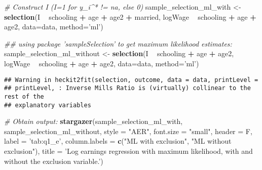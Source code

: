 \documentclass[
]{article}
\newenvironment{Shaded}{\begin{snugshade}}{\end{snugshade}}
\newcommand{\CommentTok}[1]{\textcolor[rgb]{0.56,0.35,0.01}{\textit{#1}}}
\newcommand{\DataTypeTok}[1]{\textcolor[rgb]{0.13,0.29,0.53}{#1}}
\newcommand{\KeywordTok}[1]{\textcolor[rgb]{0.13,0.29,0.53}{\textbf{#1}}}
\newcommand{\NormalTok}[1]{#1}
\newcommand{\OperatorTok}[1]{\textcolor[rgb]{0.81,0.36,0.00}{\textbf{#1}}}
\newcommand{\StringTok}[1]{\textcolor[rgb]{0.31,0.60,0.02}{#1}}
\begin{document}
\begin{Shaded}
\begin{Highlighting}[]
\CommentTok{# Construct I (I=1 for y_i^* != na, else 0)}
\NormalTok{sample_selection_ml_with <-}\StringTok{ }\KeywordTok{selection}\NormalTok{(I }\OperatorTok{~}\StringTok{ }\NormalTok{schooling }\OperatorTok{+}\StringTok{ }\NormalTok{age }\OperatorTok{+}\StringTok{ }\NormalTok{age2 }\OperatorTok{+}\StringTok{ }\NormalTok{married, }
\NormalTok{                                logWage }\OperatorTok{~}\StringTok{ }\NormalTok{schooling }\OperatorTok{+}\StringTok{ }\NormalTok{age }\OperatorTok{+}\StringTok{ }\NormalTok{age2, }\DataTypeTok{data=}\NormalTok{data, }\DataTypeTok{method=}\StringTok{'ml'}\NormalTok{)}


\CommentTok{## using package 'sampleSelection' to get maximum likelihood estimates:}
\NormalTok{sample_selection_ml_without <-}\StringTok{ }\KeywordTok{selection}\NormalTok{(I }\OperatorTok{~}\StringTok{ }\NormalTok{schooling }\OperatorTok{+}\StringTok{ }\NormalTok{age }\OperatorTok{+}\StringTok{ }\NormalTok{age2, }
\NormalTok{                                logWage }\OperatorTok{~}\StringTok{ }\NormalTok{schooling }\OperatorTok{+}\StringTok{ }\NormalTok{age }\OperatorTok{+}\StringTok{ }\NormalTok{age2, }\DataTypeTok{data=}\NormalTok{data, }\DataTypeTok{method=}\StringTok{'ml'}\NormalTok{)}
\end{Highlighting}
\end{Shaded}

\begin{verbatim}
## Warning in heckit2fit(selection, outcome, data = data, printLevel =
## printLevel, : Inverse Mills Ratio is (virtually) collinear to the rest of the
## explanatory variables
\end{verbatim}

\begin{Shaded}
\begin{Highlighting}[]
\CommentTok{# Obtain output:}
\KeywordTok{stargazer}\NormalTok{(sample_selection_ml_with, sample_selection_ml_without,}
          \DataTypeTok{style =} \StringTok{"AER"}\NormalTok{,}
          \DataTypeTok{font.size =} \StringTok{"small"}\NormalTok{,}
          \DataTypeTok{header =}\NormalTok{ F, }\DataTypeTok{label =} \StringTok{'tab:q1_e'}\NormalTok{,}
          \DataTypeTok{column.labels =} \KeywordTok{c}\NormalTok{(}\StringTok{"ML with exclusion"}\NormalTok{, }\StringTok{"ML without exclusion"}\NormalTok{),}
          \DataTypeTok{title =} \StringTok{'Log earnings regression with maximum likelihood, }
\StringTok{          with and without the exclusion variable.'}\NormalTok{)}
\end{Highlighting}
\end{Shaded}
\end{document}
